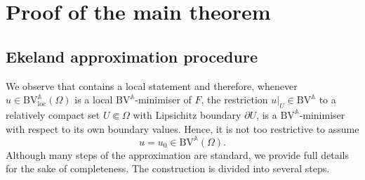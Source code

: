 \documentclass[a4paper,10pt,reqno,oneside]{amsart}
\numberwithin{equation}{section}
\newcommand{\Aop}{\mathbb{A}}
\newcommand{\BV}{\mathrm{BV}}
\newcommand{\loc}{\mathrm{loc}}
\newcommand{\del}{\partial}
\begin{document}
\section{Proof of the main theorem}
\subsection{Ekeland approximation procedure}
We observe that  contains a local statement and therefore, whenever  $u\in\BV^\Aop_\loc(\Omega)$ is a local $\BV^\Aop$-minimiser of $F$, the restriction $u\vert_U\in \BV^\Aop$ to a relatively compact set $U\Subset\Omega$ with Lipsichitz boundary $\del U$, is a $\BV^\Aop$-minimiser with respect to its own boundary values. Hence, it is not too restrictive to assume 
\begin{equation*}
	u=u_0\in \BV^\Aop(\Omega). 
\end{equation*}
 Although many steps of the approximation are standard, we provide full details for the sake of completeness. The construction is divided into several steps. \\
\end{document}

